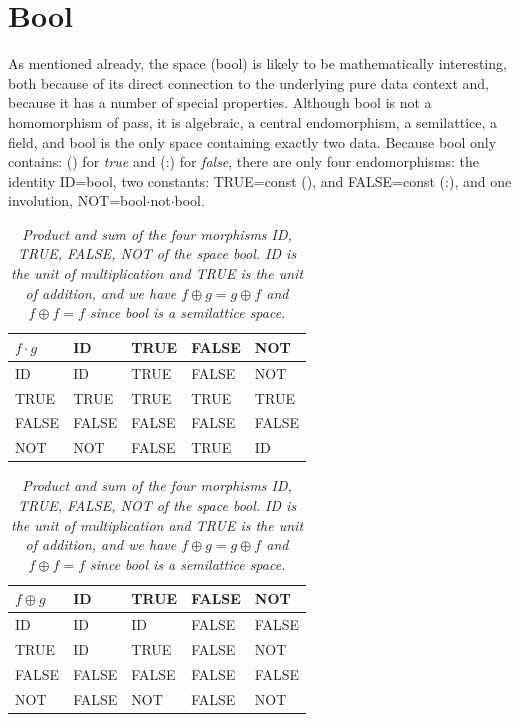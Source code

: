 \documentclass[11pt]{article}
\begin{document}
\section{Bool} 

      As mentioned already, the space (bool) is likely to be mathematically interesting, both because of its direct connection to 
the underlying pure data context and, because it has a number of special properties.  Although bool is not a homomorphism of pass,
it is algebraic, a central endomorphism, a semilattice, a field, and bool is the only space containing exactly two data. 
Because bool only contains:  () for {\it true} and (:) for {\it false}, there are only four endomorphisms:  
the identity ID=bool, two constants: TRUE=const (), and FALSE=const (:), and one involution, NOT=bool$\cdot$not$\cdot$bool.  
\begin{table}
\begin{tabular}{| l | l | l | l | l |  }
$f\cdot g$ & ID & TRUE & FALSE & NOT  \\
\hline
ID &  ID & TRUE & FALSE &  NOT \\
TRUE & TRUE & TRUE  & TRUE & TRUE \\
FALSE & FALSE  & FALSE & FALSE & FALSE   \\
NOT & NOT & FALSE & TRUE & ID \\
\hline
\end{tabular}
\begin{tabular}{| l | l | l | l | l |  }
$f\oplus g$ & ID & TRUE & FALSE & NOT  \\
\hline
ID &  ID & ID & FALSE & FALSE \\
TRUE & ID & TRUE  & FALSE & NOT \\
FALSE & FALSE  & FALSE & FALSE & FALSE   \\
NOT & FALSE & NOT & FALSE & NOT \\
\hline
\end{tabular}
\caption{{\it Product and sum of the four morphisms ID, TRUE, FALSE, NOT of the space bool.  ID is the unit of multiplication and TRUE is the 
unit of addition, and we have $f\oplus g=g\oplus f$ and $f\oplus f=f$ since bool is a semilattice space.}}
\end{table}
\end{document}
